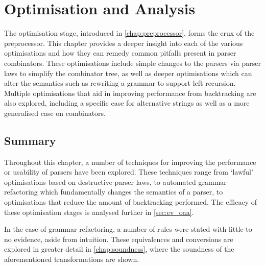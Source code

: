 \chapter{Optimisation and Analysis}
\label{chap:oaa}

The optimisation stage, introduced in \autoref{chap:preprocessor}, forms the crux of the preprocessor.
This chapter provides a deeper insight into each of the various optimisations and how they can remedy common pitfalls present in parser combinators.
These optimisations include simple changes to the parsers via parser laws to simplify the combinator tree, as well as deeper optimisations which can alter the semantics such as rewriting a grammar to support left recursion.
Multiple optimisations that aid in improving performance from backtracking are also explored, including a specific case for alternative strings as well as a more generalised case on combinators.






\section*{Summary}
Throughout this chapter, a number of techniques for improving the performance or usability of parsers have been explored.
These techniques range from `lawful' optimisations based on destructive parser laws, to automated grammar refactoring which fundamentally changes the semantics of a parser, to optimisations that reduce the amount of backtracking performed.
The efficacy of these optimisation stages is analysed further in \autoref{sec:ev_oaa}.

In the case of grammar refactoring, a number of rules were stated with little to no evidence, aside from intuition.
These equivalences and conversions are explored in greater detail in \autoref{chap:soundness}, where the soundness of the aforementioned transformations are shown.
